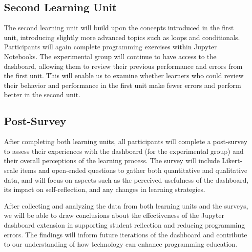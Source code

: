 \subsection{Second Learning Unit}

The second learning unit will build upon the concepts introduced in the first unit, introducing slightly more advanced topics such as loops and conditionals. Participants will again complete programming exercises within Jupyter Notebooks. The experimental group will continue to have access to the dashboard, allowing them to review their previous performance and errors from the first unit. This will enable us to examine whether learners who could review their behavior and performance in the first unit make fewer errors and perform better in the second unit.

\subsection{Post-Survey}

After completing both learning units, all participants will complete a post-survey to assess their experiences with the dashboard (for the experimental group) and their overall perceptions of the learning process. The survey will include Likert-scale items and open-ended questions to gather both quantitative and qualitative data, and will focus on aspects such as the perceived usefulness of the dashboard, its impact on self-reflection, and any changes in learning strategies.

After collecting and analyzing the data from both learning units and the surveys, we will be able to draw conclusions about the effectiveness of the Jupyter dashboard extension in supporting student reflection and reducing programming errors. The findings will inform future iterations of the dashboard and contribute to our understanding of how technology can enhance programming education.



